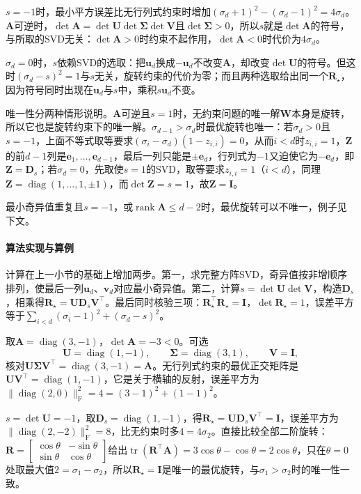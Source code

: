 $s=-1$时，最小平方误差比无行列式约束时增加$(\sigma_d+1)^2-(\sigma_d-1)^2=4\sigma_d$。$\bm A$可逆时，$\det\bm A=\det\bm U\det\bm\Sigma\det\bm V$且$\det\bm\Sigma>0$，所以$s$就是$\det\bm A$的符号，与所取的SVD无关：$\det\bm A>0$时约束不起作用，$\det\bm A<0$时代价为$4\sigma_d$。

$\sigma_d=0$时，$s$依赖SVD的选取：把$\bm u_d$换成$-\bm u_d$不改变$\bm A$，却改变$\det\bm U$的符号。但这时$(\sigma_d-s)^2=1$与$s$无关，旋转约束的代价为零；而且两种选取给出同一个$\bm R_\star$，因为符号同时出现在$\bm u_d$与$s$中，乘积$s\bm u_d$不变。

唯一性分两种情形说明。$\bm A$可逆且$s=1$时，无约束问题的唯一解$\bm W$本身是旋转，所以它也是旋转约束下的唯一解。$\sigma_{d-1}>\sigma_d$时最优旋转也唯一：若$\sigma_d>0$且$s=-1$，上面不等式取等要求$(\sigma_i-\sigma_d)(1-z_{i,i})=0$，从而$i<d$时$z_{i,i}=1$，$\bm Z$的前$d-1$列是$\bm e_1,\ldots,\bm e_{d-1}$，最后一列只能是$\pm\bm e_d$，行列式为$-1$又迫使它为$-\bm e_d$，即$\bm Z=\bm D_s$；若$\sigma_d=0$，先取使$s=1$的SVD，取等要求$z_{i,i}=1$（$i<d$），同理$\bm Z=\operatorname{diag}(1,\ldots,1,\pm1)$，而$\det\bm Z=s=1$，故$\bm Z=\bm I$。

最小奇异值重复且$s=-1$，或$\operatorname{rank}\bm A\leq d-2$时，最优旋转可以不唯一，例子见下文。

\paragraph{算法实现与算例}

计算在上一小节的基础上增加两步。第一，求完整方阵SVD，奇异值按非增顺序排列，使最后一列$\bm u_d$、$\bm v_d$对应最小奇异值。第二，计算$s=\det\bm U\det\bm V$，构造$\bm D_s$，相乘得$\bm R_\star=\bm U\bm D_s\bm V^\top$。最后同时核验三项：$\bm R_\star^\top\bm R_\star=\bm I$，$\det\bm R_\star=1$，误差平方等于$\sum_{i<d}(\sigma_i-1)^2+(\sigma_d-s)^2$。

\begin{example}[对角矩阵的旋转逼近]
\label{ex:matrix-approximation-rotation-diagonal}
取$\bm A=\operatorname{diag}(3,-1)$，$\det\bm A=-3<0$。可选
\[
 \bm U=\operatorname{diag}(1,-1),\qquad\bm\Sigma=\operatorname{diag}(3,1),\qquad\bm V=\bm I ,
\]
核对$\bm U\bm\Sigma\bm V^\top=\operatorname{diag}(3,-1)=\bm A$。无行列式约束的最优正交矩阵是$\bm U\bm V^\top=\operatorname{diag}(1,-1)$，它是关于横轴的反射，误差平方为$\lVert\operatorname{diag}(2,0)\rVert_{\mathrm F}^2=4=(3-1)^2+(1-1)^2$。

$s=\det\bm U=-1$，取$\bm D_s=\operatorname{diag}(1,-1)$，得$\bm R_\star=\bm U\bm D_s\bm V^\top=\bm I$，误差平方为$\lVert\operatorname{diag}(2,-2)\rVert_{\mathrm F}^2=8$，比无约束时多$4=4\sigma_2$。直接比较全部二阶旋转：$\bm R=\left[\begin{smallmatrix}\cos\theta&-\sin\theta\\\sin\theta&\cos\theta\end{smallmatrix}\right]$给出$\operatorname{tr}(\bm R^\top\bm A)=3\cos\theta-\cos\theta=2\cos\theta$，只在$\theta=0$处取最大值$2=\sigma_1-\sigma_2$，所以$\bm R_\star=\bm I$是唯一的最优旋转，与$\sigma_1>\sigma_2$时的唯一性一致。
\end{example}


